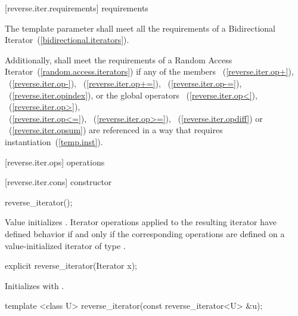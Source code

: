 [reverse.iter.requirements]{ requirements}

\pnum
The template parameter
shall meet all the requirements of a Bidirectional Iterator~(\ref{bidirectional.iterators}).

\pnum
Additionally,
shall meet the requirements of a Random Access Iterator~(\ref{random.access.iterators})
if any of the members
~(\ref{reverse.iter.op+}),
~(\ref{reverse.iter.op-}),
~(\ref{reverse.iter.op+=}),
~(\ref{reverse.iter.op-=}),
~(\ref{reverse.iter.opindex}),
or the global operators
~(\ref{reverse.iter.op<}),
~(\ref{reverse.iter.op>}),\\
~(\ref{reverse.iter.op<=}),
~(\ref{reverse.iter.op>=}),
~(\ref{reverse.iter.opdiff})
or
~(\ref{reverse.iter.opsum})
are referenced in a way that requires instantiation~(\ref{temp.inst}).

[reverse.iter.ops]{ operations}

[reverse.iter.cons]{ constructor}

%
\begin{itemdecl}
reverse_iterator();
\end{itemdecl}

\begin{itemdescr}
\pnum
\effects
Value initializes
.
Iterator operations applied to the resulting iterator have defined behavior
if and only if the corresponding operations are defined on a value-initialized iterator of type
.
\end{itemdescr}

%

\begin{itemdecl}
explicit reverse_iterator(Iterator x);
\end{itemdecl}

\begin{itemdescr}
\pnum
\effects
Initializes
with .
\end{itemdescr}

%

\begin{itemdecl}
template <class U> reverse_iterator(const reverse_iterator<U> &u);
\end{itemdecl}


